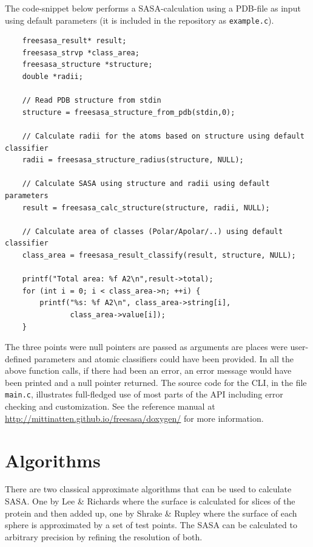 \documentclass[a4paper,11pt]{article}
\begin{document}
The code-snippet below performs a SASA-calculation using a PDB-file as
input using default parameters (it is included in the repository as
\verb|example.c|).
\begin{small}
\begin{verbatim}
    freesasa_result* result;
    freesasa_strvp *class_area;
    freesasa_structure *structure;
    double *radii;

    // Read PDB structure from stdin
    structure = freesasa_structure_from_pdb(stdin,0);

    // Calculate radii for the atoms based on structure using default classifier
    radii = freesasa_structure_radius(structure, NULL);

    // Calculate SASA using structure and radii using default parameters
    result = freesasa_calc_structure(structure, radii, NULL);
    
    // Calculate area of classes (Polar/Apolar/..) using default classifier
    class_area = freesasa_result_classify(result, structure, NULL);

    printf("Total area: %f A2\n",result->total);
    for (int i = 0; i < class_area->n; ++i) {
        printf("%s: %f A2\n", class_area->string[i],
               class_area->value[i]);
    }
\end{verbatim}
\end{small}
The three points were null pointers are passed as arguments are places
were user-defined parameters and atomic classifiers could have been
provided. In all the above function calls, if there had been an error,
an error message would have been printed and a null pointer
returned. The source code for the CLI, in the file \verb|main.c|,
illustrates full-fledged use of most parts of the API including error
checking and customization.  See the reference manual at
\url{http://mittinatten.github.io/freesasa/doxygen/} for more
information.

\section{Algorithms}\label{sec:algorithm}

There are two classical approximate algorithms that can be used to
calculate SASA. One by Lee \& Richards \cite{LnR} where the surface is
calculated for slices of the protein and then added up, one by Shrake
\& Rupley \cite{SnR} where the surface of each sphere is approximated
by a set of test points. The SASA can be calculated to arbitrary
precision by refining the resolution of both. 
\end{document}
